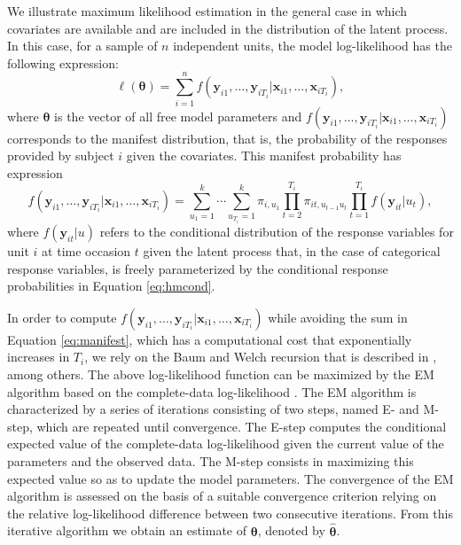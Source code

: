 We illustrate maximum likelihood estimation in the general case in which
covariates are available and are included in the distribution of the
latent process. In this case, for a sample of \(n\) independent units, the
model log-likelihood has the following expression: \[
\ell(\boldsymbol{\theta}) = \sum_{i=1}^n f(\boldsymbol{y}_{i1},\ldots,\boldsymbol{y}_{iT_i}|\boldsymbol{x}_{i1},\ldots,\boldsymbol{x}_{iT_i}),
\] where \(\boldsymbol{\theta}\) is the vector of all free model parameters and
\(f(\boldsymbol{y}_{i1},\ldots,\boldsymbol{y}_{iT_i}|\boldsymbol{x}_{i1},\ldots,\boldsymbol{ x}_{iT_i})\)
corresponds to the manifest distribution, that is, the probability of
the responses provided by subject \(i\) given the covariates. This
manifest probability has expression \begin{equation}
f(\boldsymbol{y}_{i1},\ldots,\boldsymbol{y}_{iT_i}|\boldsymbol{x}_{i1},\ldots,\boldsymbol{x}_{iT_i}) =  \sum_{u_1=1}^k\cdots\sum_{u_{T_i}=1}^k \pi_{i,u_1}
\prod_{t=2}^{T_i}\pi_{it,u_{t-1}u_t}
\prod_{t=1}^{T_i}f(\boldsymbol{y}_{it}|u_t),
\label{eq:manifest}
\end{equation} where \(f(\boldsymbol{y}_{it}|u)\) refers to the conditional
distribution of the response variables for unit \(i\) at time occasion
\(t\) given the latent process that, in the case of categorical response
variables, is freely parameterized by the conditional response
probabilities in Equation \eqref{eq:hmcond}.

In order to compute
\(f(\boldsymbol{y}_{i1},\ldots,\boldsymbol{y}_{iT_i}|\boldsymbol{x}_{i1},\ldots,\boldsymbol{x}_{iT_i})\) while
avoiding the sum in Equation \eqref{eq:manifest}, which has a
computational cost that exponentially increases in \(T_i\), we rely on the
Baum and Welch recursion \citep{baum:petr:66} that is described in
\cite{bart:farc:penn:13}, among others. The above log-likelihood function can be maximized by the EM algorithm based on the complete-data log-likelihood \citep{baum:et:al:70,demp:lair:rubi:77}. The EM algorithm is characterized by a series of
iterations consisting of two steps, named E- and M-step, which are
repeated until convergence. The E-step computes the conditional expected
value of the complete-data log-likelihood given the current value of the
parameters and the observed data. The M-step consists in maximizing this
expected value so as to update the model parameters. The convergence of
the EM algorithm is assessed on the basis of a suitable convergence
criterion relying on the relative log-likelihood difference between two
consecutive iterations. From this iterative algorithm we obtain an
estimate of \(\boldsymbol{\theta}\), denoted by \(\boldsymbol{\hat{\theta}}\).

